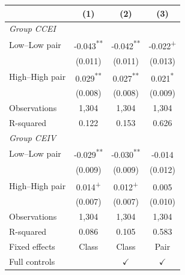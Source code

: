 \begin{tabular}{lccc}\toprule
& (1) & (2) & (3)\\\midrule
\multicolumn{4}{l}{\textit{Group CCEI}}\\[3pt]
Low--Low pair & -0.043\textsuperscript{**} & -0.042\textsuperscript{**} & -0.022\textsuperscript{+}\\
 & (0.011) & (0.011) & (0.013)\\
High--High pair & 0.029\textsuperscript{**} & 0.027\textsuperscript{**} & 0.021\textsuperscript{*}\\
 & (0.008) & (0.008) & (0.009)\\
Observations & 1,304 & 1,304 & 1,304\\
R-squared & 0.122 & 0.153 & 0.626\\\midrule
\multicolumn{4}{l}{\textit{Group CEIV}}\\[3pt]
Low--Low pair & -0.029\textsuperscript{**} & -0.030\textsuperscript{**} & -0.014\textsuperscript{}\\
 & (0.009) & (0.009) & (0.012)\\
High--High pair & 0.014\textsuperscript{+} & 0.012\textsuperscript{+} & 0.005\textsuperscript{}\\
 & (0.007) & (0.007) & (0.010)\\
Observations & 1,304 & 1,304 & 1,304\\
R-squared & 0.086 & 0.105 & 0.583\\\midrule
Fixed effects & Class & Class & Pair\\
Full controls & & $\checkmark$ & $\checkmark$\\
\bottomrule\end{tabular}
